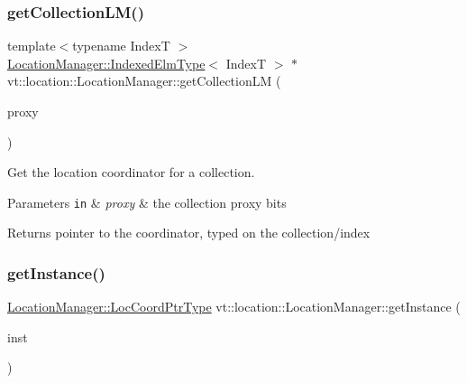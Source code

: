 \subsubsection{\texorpdfstring{get\+Collection\+L\+M()}{getCollectionLM()}}
{\footnotesize\ttfamily template$<$typename IndexT $>$ \\
\hyperlink{structvt_1_1location_1_1_location_manager_a9241475655a978ac717ffe5791ad7d15}{Location\+Manager\+::\+Indexed\+Elm\+Type}$<$ IndexT $>$ $\ast$ vt\+::location\+::\+Location\+Manager\+::get\+Collection\+LM (\begin{DoxyParamCaption}\item[{\hyperlink{namespacevt_a1b417dd5d684f045bb58a0ede70045ac}{Virtual\+Proxy\+Type} const \&}]{proxy }\end{DoxyParamCaption})}



Get the location coordinator for a collection. 


\begin{DoxyParams}[1]{Parameters}
\mbox{\tt in}  & {\em proxy} & the collection proxy bits\\
\hline
\end{DoxyParams}
\begin{DoxyReturn}{Returns}
pointer to the coordinator, typed on the collection/index 
\end{DoxyReturn}
\mbox{\label{structvt_1_1location_1_1_location_manager_a1533939b198e3d7a2d5298995b87ab21}} 
\subsubsection{\texorpdfstring{get\+Instance()}{getInstance()}}
{\footnotesize\ttfamily \hyperlink{structvt_1_1location_1_1_location_manager_a98ed824c058080e538546fc731cb8f4c}{Location\+Manager\+::\+Loc\+Coord\+Ptr\+Type} vt\+::location\+::\+Location\+Manager\+::get\+Instance (\begin{DoxyParamCaption}\item[{\hyperlink{namespacevt_1_1location_a4db6456e8024af2d23fc5ae560fef866}{Loc\+Inst\+Type} const}]{inst }\end{DoxyParamCaption})\hspace{0.3cm}{\ttfamily [static]}}



